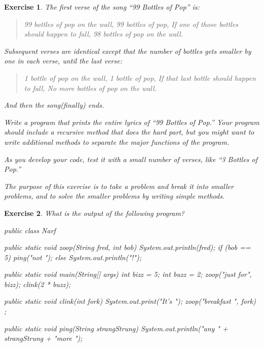 \documentclass[12pt]{book}
\theoremstyle{exercise}
\newtheorem{exercise}{Exercise}[chapter]
\begin{document}
\begin{exercise}
The first verse of the song ``99 Bottles of Pop'' is:

\begin{quote}
99 bottles of pop on the wall,
99 bottles of pop,
If one of those bottles should happen to fall,
98 bottles of pop on the wall.
\end{quote}

Subsequent verses are identical except that the number of bottles gets smaller by one in each verse, until the last verse:

\begin{quote}
1 bottle of pop on the wall,
1 bottle of pop,
If that last bottle should happen to fall,
No more bottles of pop on the wall.
\end{quote}

And then the song(finally) ends.

Write a program that prints the entire lyrics of ``99 Bottles of Pop.''
Your program should include a {\em recursive} method that does the hard part, but you might want to write additional methods to separate the major functions of the program.

As you develop your code, test it with a small number of verses, like ``3 Bottles of Pop.''

The purpose of this exercise is to take a problem and break it into smaller problems, and to solve the smaller problems by writing simple methods.
\end{exercise}

\begin{exercise}
What is the output of the following program?

\begin{code}
public class Narf {

    public static void zoop(String fred, int bob) {
        System.out.println(fred);
        if (bob == 5) {
            ping("not ");
        } else {
            System.out.println("!");
        }
    }

    public static void main(String[] args) {
        int bizz = 5;
        int buzz = 2;
        zoop("just for", bizz);
        clink(2 * buzz);
    }

    public static void clink(int fork) {
        System.out.print("It's ");
        zoop("breakfast ", fork) ;
    }

    public static void ping(String strangStrung) {
        System.out.println("any " + strangStrung + "more ");
    }
}
\end{code}
\end{exercise}
\end{document}
